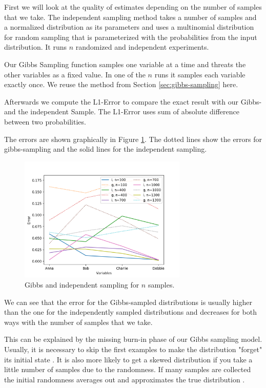 \documentclass{support/acm_proc_article-sp}
\begin{document}
    First we will look at the quality of estimates depending on the number of samples that we take.
    The independent sampling method takes a number of samples and a normalized distribution as its parameters
    and uses a multinomial distribution for random sampling that is parameterized with the probabilities from the input
    distribution.
    It runs $n$ randomized and independent experiments.

    Our Gibbs Sampling function samples one variable at a time and threats the other variables as a fixed value.
    In one of the $n$ runs it samples each variable exactly once.
    We reuse the method from Section \ref{sec:gibbs-sampling} here.

    Afterwards we compute the L1-Error to compare the exact result with our Gibbs- and the independent Sample.
    The L1-Error uses sum of absolute difference between two probabilities.

    The errors are shown graphically in Figure \ref{fig:gibbs-n}.
    The dotted lines show the errors for gibbs-sampling and the solid lines for the independent sampling.
    \begin{figure}[!htbp]
        \centering
        \includegraphics[width=8cm]{images/gibbs-n.png}
        \caption{Gibbs and independent sampling for $n$ samples.}
        \label{fig:gibbs-n}
    \end{figure}

    We can see that the error for the Gibbs-sampled distributions is usually higher than the one for the independently
    sampled distributions and decreases for both ways with the number of samples that we take.

    This can be explained by the missing burn-in phase of our Gibbs sampling model.
    Usually, it is necessary to skip the first examples to make the distribution "forget" its initial state \cite[p.856f.]{Murphy:2012:MLP:2380985}.
    It is also more likely to get a skewed distribution if you take a little number of samples due to the randomness.
    If many samples are collected the initial randomness averages out and approximates the true distribution \cite[p.96f.]{HoffPeterD2009Afci}.
\end{document}
